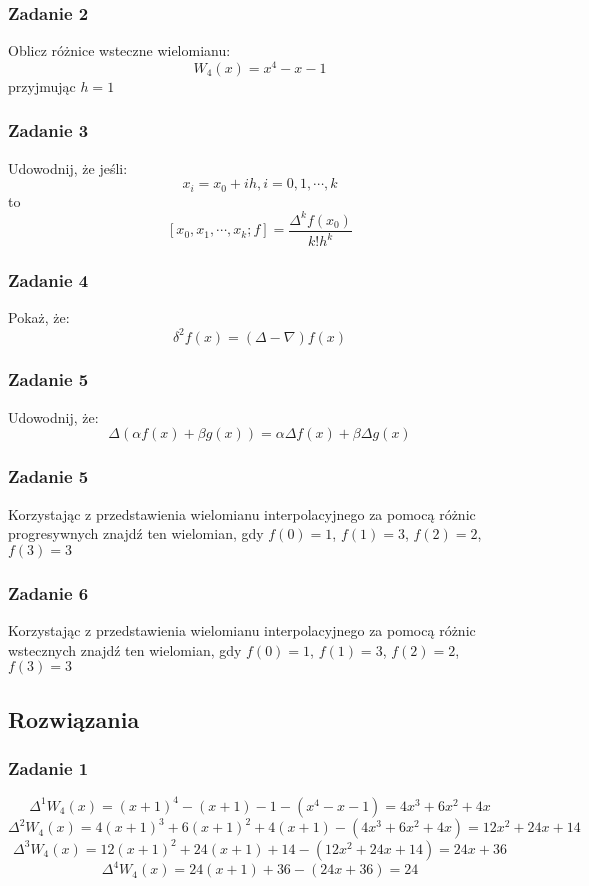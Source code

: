 \documentclass[a4paper]{article}
\begin{document}
\subsubsection*{Zadanie 2}
Oblicz różnice wsteczne wielomianu:
$$W_4(x)=x^4-x-1$$
przyjmując $h=1$

\subsubsection*{Zadanie 3}
Udowodnij, że jeśli:
$$x_i = x_0 + ih, i=0,1,\cdots,k$$
to
$$[x_0,x_1,\cdots,x_k;f]=\frac{\Delta^kf(x_0)}{k!h^k}$$

\subsubsection*{Zadanie 4}
Pokaż, że:
$$\delta^2f(x)=(\Delta-\nabla)f(x)$$

\subsubsection*{Zadanie 5}
Udowodnij, że:
$$\Delta(\alpha f(x) + \beta g(x)) = \alpha\Delta f(x) + \beta\Delta g(x)$$

\subsubsection*{Zadanie 5}
Korzystając z przedstawienia wielomianu interpolacyjnego za pomocą różnic progresywnych znajdź ten wielomian, gdy $f(0) = 1$, $f(1) = 3$, $f(2) = 2$, $f(3) = 3$

\subsubsection*{Zadanie 6}
Korzystając z przedstawienia wielomianu interpolacyjnego za pomocą różnic wstecznych znajdź ten wielomian, gdy $f(0) = 1$, $f(1) = 3$, $f(2) = 2$, $f(3) = 3$

\subsection{Rozwiązania}
\subsubsection*{Zadanie 1}
$$\Delta^1 W_4(x) = (x+1)^4 - (x+1) - 1 - (x^4 - x - 1) = 4x^3 + 6x^2 + 4x$$
$$\Delta^2 W_4(x) = 4(x+1)^3 + 6(x+1)^2 + 4(x+1) - (4x^3 + 6x^2 + 4x) = 12x^2 + 24x + 14$$
$$\Delta^3 W_4(x) = 12(x+1)^2 + 24(x+1) + 14 - (12x^2 + 24x + 14) = 24x + 36$$
$$\Delta^4 W_4(x) = 24(x+1) + 36 - (24x + 36) = 24$$
\end{document}
